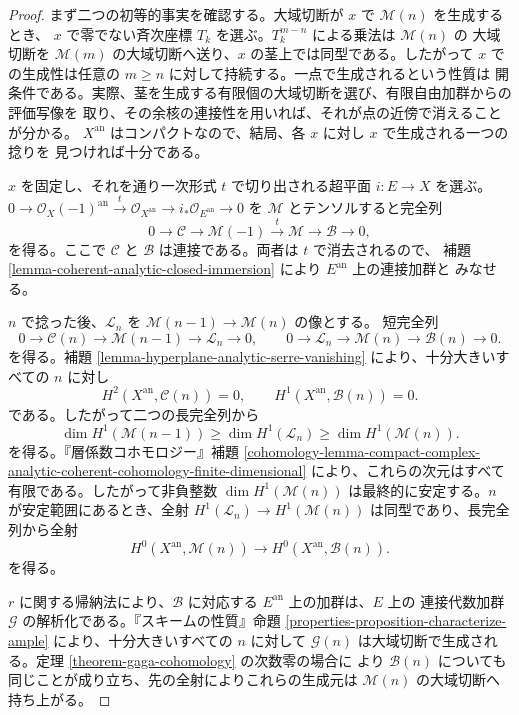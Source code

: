 \begin{proof}
まず二つの初等的事実を確認する。大域切断が $x$ で $\mathcal M(n)$ を生成するとき、
$x$ で零でない斉次座標 $T_k$ を選ぶ。$T_k^{m-n}$ による乗法は $\mathcal M(n)$ の
大域切断を $\mathcal M(m)$ の大域切断へ送り、$x$ の茎上では同型である。したがって
$x$ での生成性は任意の $m\geq n$ に対して持続する。一点で生成されるという性質は
開条件である。実際、茎を生成する有限個の大域切断を選び、有限自由加群からの評価写像を
取り、その余核の連接性を用いれば、それが点の近傍で消えることが分かる。
$X^{\mathrm{an}}$ はコンパクトなので、結局、各 $x$ に対し $x$ で生成される一つの捻りを
見つければ十分である。

$x$ を固定し、それを通り一次形式 $t$ で切り出される超平面 $i:E\to X$ を選ぶ。
$0\to\mathcal O_X(-1)^{\mathrm{an}}\xrightarrow{t}
\mathcal O_{X^{\mathrm{an}}}\to i_*\mathcal O_{E^{\mathrm{an}}}\to0$
を $\mathcal M$ とテンソルすると完全列
$$
0\longrightarrow\mathcal C\longrightarrow\mathcal M(-1)
\xrightarrow{t}\mathcal M\longrightarrow\mathcal B\longrightarrow0,
$$
を得る。ここで $\mathcal C$ と $\mathcal B$ は連接である。両者は $t$ で消去されるので、
補題 \ref{lemma-coherent-analytic-closed-immersion} により $E^{\mathrm{an}}$ 上の連接加群と
みなせる。

$n$ で捻った後、$\mathcal L_n$ を $\mathcal M(n-1)\to\mathcal M(n)$ の像とする。
短完全列
$$
0\to\mathcal C(n)\to\mathcal M(n-1)\to\mathcal L_n\to0,
\qquad
0\to\mathcal L_n\to\mathcal M(n)\to\mathcal B(n)\to0.
$$
を得る。補題 \ref{lemma-hyperplane-analytic-serre-vanishing} により、十分大きいすべての
$n$ に対し
$$
H^2(X^{\mathrm{an}},\mathcal C(n))=0,
\qquad
H^1(X^{\mathrm{an}},\mathcal B(n))=0.
$$
である。したがって二つの長完全列から
$$
\dim H^1(\mathcal M(n-1))
\geq\dim H^1(\mathcal L_n)
\geq\dim H^1(\mathcal M(n)).
$$
を得る。『層係数コホモロジー』補題
\ref{cohomology-lemma-compact-complex-analytic-coherent-cohomology-finite-dimensional}
により、これらの次元はすべて有限である。したがって非負整数
$\dim H^1(\mathcal M(n))$ は最終的に安定する。$n$ が安定範囲にあるとき、全射
$H^1(\mathcal L_n)\to H^1(\mathcal M(n))$ は同型であり、長完全列から全射
$$
H^0(X^{\mathrm{an}},\mathcal M(n))
\longrightarrow H^0(X^{\mathrm{an}},\mathcal B(n)).
$$
を得る。

$r$ に関する帰納法により、$\mathcal B$ に対応する $E^{\mathrm{an}}$ 上の加群は、$E$ 上の
連接代数加群 $\mathcal G$ の解析化である。『スキームの性質』命題
\ref{properties-proposition-characterize-ample} により、十分大きいすべての $n$ に対して
$\mathcal G(n)$ は大域切断で生成される。定理 \ref{theorem-gaga-cohomology} の次数零の場合に
より $\mathcal B(n)$ についても同じことが成り立ち、先の全射によりこれらの生成元は
$\mathcal M(n)$ の大域切断へ持ち上がる。


\end{proof}
